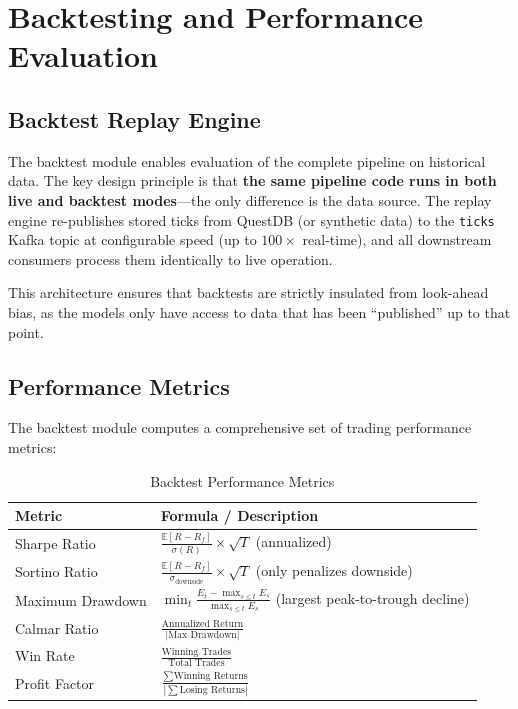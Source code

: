 \documentclass[letterpaper,11pt]{report}
\begin{document}
\chapter{Backtesting and Performance Evaluation}

\section{Backtest Replay Engine}

The backtest module enables evaluation of the complete pipeline on historical data. The key design principle is that \textbf{the same pipeline code runs in both live and backtest modes}---the only difference is the data source. The replay engine re-publishes stored ticks from QuestDB (or synthetic data) to the \texttt{ticks} Kafka topic at configurable speed (up to $100\times$ real-time), and all downstream consumers process them identically to live operation.

This architecture ensures that backtests are strictly insulated from look-ahead bias, as the models only have access to data that has been ``published'' up to that point.

\section{Performance Metrics}

The backtest module computes a comprehensive set of trading performance metrics:

\begin{table}[h]
\centering
\caption{Backtest Performance Metrics}
\begin{tabular}{lp{8cm}}
\toprule
\textbf{Metric} & \textbf{Formula / Description} \\
\midrule
Sharpe Ratio & $\frac{\mathbb{E}[R - R_f]}{\sigma(R)} \times \sqrt{T}$ (annualized) \\
Sortino Ratio & $\frac{\mathbb{E}[R - R_f]}{\sigma_{\text{downside}}} \times \sqrt{T}$ (only penalizes downside) \\
Maximum Drawdown & $\min_t \frac{E_t - \max_{s \leq t} E_s}{\max_{s \leq t} E_s}$ (largest peak-to-trough decline) \\
Calmar Ratio & $\frac{\text{Annualized Return}}{|\text{Max Drawdown}|}$ \\
Win Rate & $\frac{\text{Winning Trades}}{\text{Total Trades}}$ \\
Profit Factor & $\frac{\sum \text{Winning Returns}}{|\sum \text{Losing Returns}|}$ \\
\bottomrule
\end{tabular}
\end{table}
\end{document}
